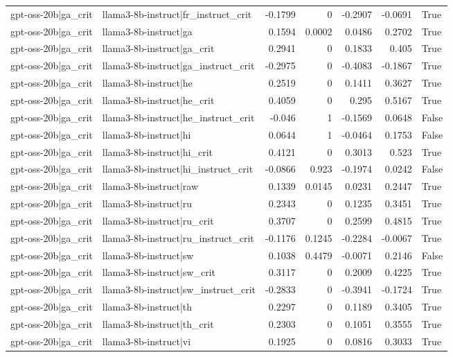 \begin{table}
\begin{tabular}{l l r r r r l}
gpt-oss-20b|ga_crit & llama3-8b-instruct|fr_instruct_crit & -0.1799 & 0 & -0.2907 & -0.0691 & True \\
gpt-oss-20b|ga_crit & llama3-8b-instruct|ga & 0.1594 & 0.0002 & 0.0486 & 0.2702 & True \\
gpt-oss-20b|ga_crit & llama3-8b-instruct|ga_crit & 0.2941 & 0 & 0.1833 & 0.405 & True \\
gpt-oss-20b|ga_crit & llama3-8b-instruct|ga_instruct_crit & -0.2975 & 0 & -0.4083 & -0.1867 & True \\
gpt-oss-20b|ga_crit & llama3-8b-instruct|he & 0.2519 & 0 & 0.1411 & 0.3627 & True \\
gpt-oss-20b|ga_crit & llama3-8b-instruct|he_crit & 0.4059 & 0 & 0.295 & 0.5167 & True \\
gpt-oss-20b|ga_crit & llama3-8b-instruct|he_instruct_crit & -0.046 & 1 & -0.1569 & 0.0648 & False \\
gpt-oss-20b|ga_crit & llama3-8b-instruct|hi & 0.0644 & 1 & -0.0464 & 0.1753 & False \\
gpt-oss-20b|ga_crit & llama3-8b-instruct|hi_crit & 0.4121 & 0 & 0.3013 & 0.523 & True \\
gpt-oss-20b|ga_crit & llama3-8b-instruct|hi_instruct_crit & -0.0866 & 0.923 & -0.1974 & 0.0242 & False \\
gpt-oss-20b|ga_crit & llama3-8b-instruct|raw & 0.1339 & 0.0145 & 0.0231 & 0.2447 & True \\
gpt-oss-20b|ga_crit & llama3-8b-instruct|ru & 0.2343 & 0 & 0.1235 & 0.3451 & True \\
gpt-oss-20b|ga_crit & llama3-8b-instruct|ru_crit & 0.3707 & 0 & 0.2599 & 0.4815 & True \\
gpt-oss-20b|ga_crit & llama3-8b-instruct|ru_instruct_crit & -0.1176 & 0.1245 & -0.2284 & -0.0067 & True \\
gpt-oss-20b|ga_crit & llama3-8b-instruct|sw & 0.1038 & 0.4479 & -0.0071 & 0.2146 & False \\
gpt-oss-20b|ga_crit & llama3-8b-instruct|sw_crit & 0.3117 & 0 & 0.2009 & 0.4225 & True \\
gpt-oss-20b|ga_crit & llama3-8b-instruct|sw_instruct_crit & -0.2833 & 0 & -0.3941 & -0.1724 & True \\
gpt-oss-20b|ga_crit & llama3-8b-instruct|th & 0.2297 & 0 & 0.1189 & 0.3405 & True \\
gpt-oss-20b|ga_crit & llama3-8b-instruct|th_crit & 0.2303 & 0 & 0.1051 & 0.3555 & True \\
gpt-oss-20b|ga_crit & llama3-8b-instruct|vi & 0.1925 & 0 & 0.0816 & 0.3033 & True \\

\end{tabular}
\end{table}
